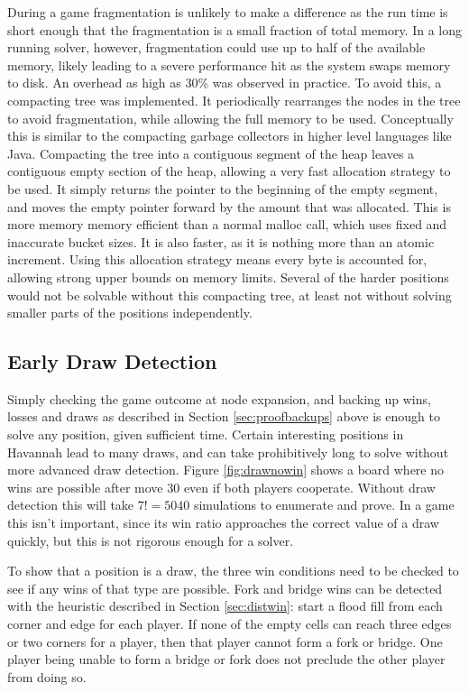 During a game fragmentation is unlikely to make a difference as the run time is short enough that the fragmentation is a small fraction of total memory. In a long running solver, however, fragmentation could use up to half of the available memory, likely leading to a severe performance hit as the system swaps memory to disk. An overhead as high as 30\% was observed in practice. To avoid this, a compacting tree was implemented. It periodically rearranges the nodes in the tree to avoid fragmentation, while allowing the full memory to be used. Conceptually this is similar to the compacting garbage collectors in higher level languages like Java. Compacting the tree into a contiguous segment of the heap leaves a contiguous empty section of the heap, allowing a very fast allocation strategy to be used. It simply returns the pointer to the beginning of the empty segment, and moves the empty pointer forward by the amount that was allocated. This is more memory memory efficient than a normal malloc call, which uses fixed and inaccurate bucket sizes. It is also faster, as it is nothing more than an atomic increment. Using this allocation strategy means every byte is accounted for, allowing strong upper bounds on memory limits. Several of the harder positions would not be solvable without this compacting tree, at least not without solving smaller parts of the positions independently.

\subsection{Early Draw Detection}\label{sec:drawdetect}

Simply checking the game outcome at node expansion, and backing up wins, losses and draws as described in Section \ref{sec:proofbackups} above is enough to solve any position, given sufficient time. Certain interesting positions in Havannah lead to many draws, and can take prohibitively long to solve without more advanced draw detection. Figure \ref{fig:drawnowin} shows a board where no wins are possible after move 30 even if both players cooperate. Without draw detection this will take $7!=5040$ simulations to enumerate and prove. In a game this isn't important, since its win ratio approaches the correct value of a draw quickly, but this is not rigorous enough for a solver.

To show that a position is a draw, the three win conditions need to be checked to see if any wins of that type are possible. Fork and bridge wins can be detected with the heuristic described in Section \ref{sec:distwin}: start a flood fill from each corner and edge for each player. If none of the empty cells can reach three edges or two corners for a player, then that player cannot form a fork or bridge. One player being unable to form a bridge or fork does not preclude the other player from doing so.

